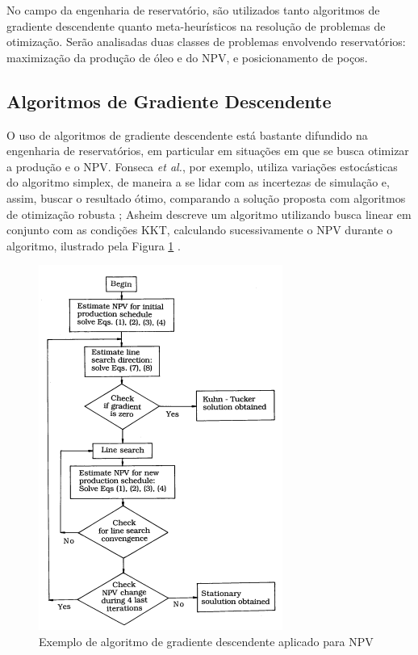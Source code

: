 No campo da engenharia de reservatório, são utilizados tanto algoritmos de gradiente descendente quanto meta-heurísticos na resolução de problemas de otimização. Serão analisadas duas classes de problemas envolvendo reservatórios: maximização da produção de óleo e do NPV, e posicionamento de poços.
\nocite{EOR:Intro}


\subsection{Algoritmos de Gradiente Descendente}
O uso de algoritmos de gradiente descendente está bastante difundido na engenharia de reservatórios, em particular em situações em que se busca otimizar a produção e o NPV. Fonseca \textit{et al.}, por exemplo, utiliza variações estocásticas do algoritmo simplex, de maneira a se lidar com as incertezas de simulação e, assim, buscar o resultado ótimo, comparando a solução proposta com algoritmos de otimização robusta \cite{fonseca}; Asheim descreve um algoritmo utilizando busca linear em conjunto com as condições KKT, calculando sucessivamente o NPV durante o algoritmo, ilustrado pela Figura \ref{fig:asheim1} \cite{asheim88}.

\begin{figure}[H]
	\centering
	\includegraphics[width=.5\textwidth]{figs/revisao/revisao_asheim1}
	\caption{Exemplo de algoritmo de gradiente descendente aplicado para NPV \cite{asheim88}\label{fig:asheim1}}
\end{figure}

